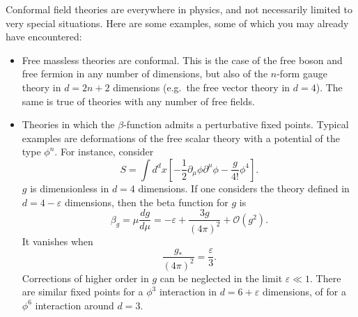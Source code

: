 \documentclass[a4paper,12pt]{article}
\numberwithin{equation}{section}
\begin{document}
Conformal field theories are everywhere in physics, and not necessarily limited to very special situations. Here are some examples, some of which you may already have encountered:%
%
\begin{itemize}

\item
Free massless theories are conformal. This is the case of the free boson and free fermion in any number of dimensions, but also of the $n$-form gauge theory in $d = 2n + 2$ dimensions (e.g.~the free vector theory in $d = 4$). The same is true of theories with any number of free fields.

\item
Theories in which the $\beta$-function admits a perturbative fixed points. Typical examples are deformations of the free scalar theory with a potential of the type $\phi^n$. For instance, consider
\begin{equation}
	S = \int d^dx \left[
	- \frac{1}{2} \partial_\mu \phi \partial^\mu \phi
	- \frac{g}{4!} \phi^4 \right].
\end{equation}
$g$ is dimensionless in $d = 4$ dimensions. If one considers the theory defined in $d = 4 - \varepsilon$ dimensions, then the beta function for $g$ is
\begin{equation}
	\beta_g = \mu \frac{dg}{d\mu}
	= - \varepsilon + \frac{3g}{(4\pi)^2}
	+ \mathcal{O}(g^2).
\end{equation}
It vanishes when
\begin{equation}
	\frac{g_*}{(4\pi)^2} = \frac{\varepsilon}{3}.
\end{equation}
Corrections of higher order in $g$ can be neglected in the limit $\varepsilon \ll 1$.
There are similar fixed points for a $\phi^3$ interaction in $d = 6 + \varepsilon$ dimensions, of for a $\phi^6$ interaction around $d = 3$.



\end{itemize}
\end{document}
